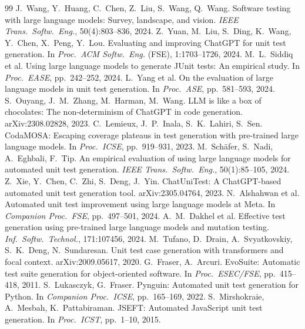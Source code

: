 \documentclass[sigconf]{acmart}
\begin{document}
\begin{thebibliography}{99}
\small
{} J.~Wang, Y.~Huang, C.~Chen, Z.~Liu, S.~Wang, Q.~Wang. Software testing with large language models: Survey, landscape, and vision. \textit{IEEE Trans.\ Softw.\ Eng.}, 50(4):803--836, 2024.
 Z.~Yuan, M.~Liu, S.~Ding, K.~Wang, Y.~Chen, X.~Peng, Y.~Lou. Evaluating and improving ChatGPT for unit test generation. In \textit{Proc.\ ACM Softw.\ Eng.} (FSE), 1:1703--1726, 2024.
 M.~L.~Siddiq et al. Using large language models to generate JUnit tests: An empirical study. In \textit{Proc.\ EASE}, pp.\ 242--252, 2024.
 L.~Yang et al. On the evaluation of large language models in unit test generation. In \textit{Proc.\ ASE}, pp.\ 581--593, 2024.
 S.~Ouyang, J.~M.~Zhang, M.~Harman, M.~Wang. LLM is like a box of chocolates: The non-determinism of ChatGPT in code generation. arXiv:2308.02828, 2023.
 C.~Lemieux, J.~P.~Inala, S.~K.~Lahiri, S.~Sen. CodaMOSA: Escaping coverage plateaus in test generation with pre-trained large language models. In \textit{Proc.\ ICSE}, pp.\ 919--931, 2023.
 M.~Sch\"afer, S.~Nadi, A.~Eghbali, F.~Tip. An empirical evaluation of using large language models for automated unit test generation. \textit{IEEE Trans.\ Softw.\ Eng.}, 50(1):85--105, 2024.
 Z.~Xie, Y.~Chen, C.~Zhi, S.~Deng, J.~Yin. ChatUniTest: A ChatGPT-based automated unit test generation tool. arXiv:2305.04764, 2023.
 N.~Alshahwan et al. Automated unit test improvement using large language models at Meta. In \textit{Companion Proc.\ FSE}, pp.\ 497--501, 2024.
 A.~M.~Dakhel et al. Effective test generation using pre-trained large language models and mutation testing. \textit{Inf.\ Softw.\ Technol.}, 171:107456, 2024.
 M.~Tufano, D.~Drain, A.~Svyatkovskiy, S.~K.~Deng, N.~Sundaresan. Unit test case generation with transformers and focal context. arXiv:2009.05617, 2020.
 G.~Fraser, A.~Arcuri. EvoSuite: Automatic test suite generation for object-oriented software. In \textit{Proc.\ ESEC/FSE}, pp.\ 415--418, 2011.
 S.~Lukasczyk, G.~Fraser. Pynguin: Automated unit test generation for Python. In \textit{Companion Proc.\ ICSE}, pp.\ 165--169, 2022.
 S.~Mirshokraie, A.~Mesbah, K.~Pattabiraman. JSEFT: Automated JavaScript unit test generation. In \textit{Proc.\ ICST}, pp.\ 1--10, 2015.

\end{thebibliography}
\end{document}
